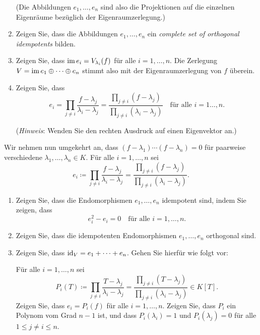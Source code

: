 \documentclass[a4paper,10pt]{scrartcl}
\begin{document}
\begin{question}
\begin{enumerate}[resume]
\[      \]
      (Die Abbildungen $e_1, \dotsc, e_n$ sind also die Projektionen auf die einzelnen Eigenräume bezüglich der Eigenraumzerlegung.)
    \item
      Zeigen Sie, dass die Abbildungen $e_1, \dotsc, e_n$ ein \emph{complete set of orthogonal idempotents} bilden.
    \item
      Zeigen Sie, dass $\operatorname{im} e_i = V_{\lambda_i}(f)$ für alle $i = 1, \dotsc, n$.
      Die Zerlegung $V = \operatorname{im} e_1 \oplus \dotsb \oplus e_n$ stimmt also mit der Eigenraumzerlegung von $f$ überein.
    \item
      Zeigen Sie, dass
      \[
          e_i
        = \prod_{j \neq i} \frac{f - \lambda_j}{\lambda_i - \lambda_j}
        = \frac{\prod_{j \neq i} (f-\lambda_j)}{\prod_{j \neq i} (\lambda_i - \lambda_j)}
        \quad
        \text{für alle $i = 1 \dotsc, n$}.
      \]
      
      (\emph{Hinweis}:
       Wenden Sie den rechten Ausdruck auf einen Eigenvektor an.)
  \end{enumerate}
  Wir nehmen nun umgekehrt an, dass $(f - \lambda_1) \dotsm (f - \lambda_n) = 0$ für paarweise verschiedene $\lambda_1, \dotsc, \lambda_n \in K$.
  Für alle $i = 1, \dotsc, n$ sei
  \[
              e_i
    \coloneqq \prod_{j \neq i} \frac{f - \lambda_j}{\lambda_i - \lambda_j}
    =         \frac{\prod_{j \neq i} (f-\lambda_j)}{\prod_{j \neq i} (\lambda_i - \lambda_j)}.
  \]
  \begin{enumerate}[resume]
    \item
      Zeigen Sie, dass die Endomorphismen $e_1, \dotsc, e_n$ idempotent sind, indem Sie zeigen, dass
      \[
        e_i^2 - e_i = 0
        \quad
        \text{für alle $i = 1, \dotsc, n$}.
      \]
    \item
      Zeigen Sie, dass die idempotenten Endomorphismen $e_1, \dotsc, e_n$ orthogonal sind.
    \item
      Zeigen Sie, dass $\operatorname{id}_V = e_1 + \dotsb + e_n$.
      Gehen Sie hierfür wie folgt vor:
      
      Für alle $i = 1, \dotsc, n$ sei
      \[
                  P_i(T)
        \coloneqq \prod_{j \neq i} \frac{T - \lambda_j}{\lambda_i - \lambda_j}
        =         \frac{\prod_{j \neq i} (T-\lambda_j)}{\prod_{j \neq i} (\lambda_i - \lambda_j)}
        \in K[T].
      \]
      Zeigen Sie, dass $e_i = P_i(f)$ für alle $i = 1, \dotsc, n$.
      Zeigen Sie, dass $P_i$ ein Polynom vom Grad $n-1$ ist, und dass $P_i(\lambda_i) = 1$ und $P_i(\lambda_j) = 0$ für alle $1 \leq j \neq i \leq n$.
      

\end{enumerate}
\end{question}
\end{document}
